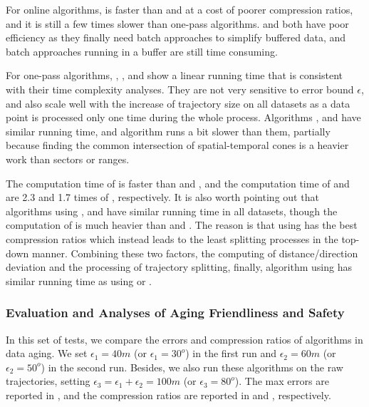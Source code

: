 For online algorithms, \squishe is faster than \bqsa and \opwa at a cost of poorer compression ratios, and it is still a few times slower than one-pass algorithms. \bqsa and \opwa both have poor efficiency as they finally need batch approaches to simplify buffered data, and batch approaches running in a buffer are still time consuming.

For one-pass algorithms, \operb, \siped, \cised and \interval show a linear running time that is consistent with their time complexity analyses. They are not very sensitive to error bound $\epsilon$, and also scale well with the increase of trajectory size on all datasets as a data point is processed only one time during the whole process.
Algorithms \siped, \operb and \interval have similar running time, and algorithm \cised runs a bit slower than them, partially because finding the common intersection of spatial-temporal cones is a heavier work than sectors or ranges.



The computation time of \dad is faster than \ped and \sed, and the computation time of \ped and \sed are 2.3 and 1.7 times of \dad, respectively.
{It is also worth pointing out that algorithms \dpa using \ped, \sed and \dad have similar running time in all datasets, though the computation of \ped is much heavier than \sed and \dad. The reason is that \dpa using \ped has the best compression ratios which instead leads to the least splitting processes in the top-down manner. Combining these two factors, \ie the computing of distance/direction deviation and the processing of trajectory splitting, finally, algorithm \dpa using \ped has similar running time as \dpa using \dad or \sed.}

\subsubsection{{Evaluation and Analyses of Aging Friendliness and Safety}}
\label{sec:exp-data-aging}
In this set of tests, we compare the errors and compression ratios of algorithms in data aging. We set $\epsilon_1=40m$ (or $\epsilon_1=30^o$) in the first run and $\epsilon_2=60m$ (or $\epsilon_2=50^o$) in the second run. Besides, we also run these algorithms on the raw trajectories, setting $\epsilon_3=\epsilon_1 + \epsilon_2=100m$ (or $\epsilon_3=80^o$). The max errors are reported in , and the compression ratios are reported in  and , respectively.

